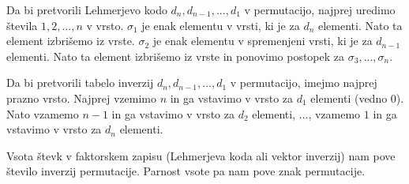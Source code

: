 \documentclass[a4paper, 12pt]{book}
\begin{document}
Da bi pretvorili Lehmerjevo kodo $d_n, d_{n-1}, ..., d_1$ v permutacijo, najprej uredimo števila $1, 2, ..., n$ v vrsto. $\sigma_1$ je enak elementu v vrsti, ki je za $d_{n}$ elementi. Nato ta element izbrišemo iz vrste. $\sigma_2$ je enak elementu v spremenjeni vrsti, ki je za $d_{n-1}$ elementi. Nato ta element izbrišemo iz vrste in ponovimo postopek za $\sigma_3, ..., \sigma_n$.

Da bi pretvorili tabelo inverzij $d_n, d_{n-1}, ..., d_1$ v permutacijo, imejmo najprej prazno vrsto. Najprej vzemimo $n$ in ga vstavimo v vrsto za $d_1$ elementi (vedno $0$). Nato vzamemo $n-1$ in ga vstavimo v vrsto za $d_{2}$ elementi, ..., vzamemo $1$ in ga vstavimo v vrsto za $d_{n}$ elementi.

Vsota števk v faktorskem zapisu (Lehmerjeva koda ali vektor inverzij) nam pove število inverzij permutacije. Parnost vsote pa nam pove znak permutacije.
\end{document}

